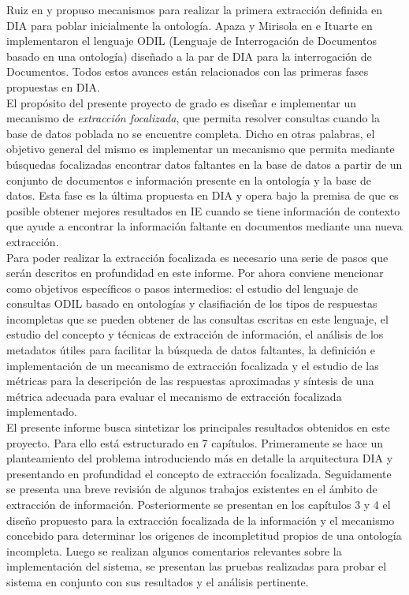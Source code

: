 Ruiz en \cite{ruiz-HMM} y \cite{SemistructuredTextExtraction} propuso mecanismos para realizar la primera extracción definida en DIA para poblar inicialmente la ontología. Apaza y Mirisola en \cite{ODILImplementation} e Ituarte en \cite{ODILImplementationDefinition} implementaron el lenguaje ODIL (Lenguaje de Interrogación de Documentos basado en una ontología) diseñado a la par de DIA para la interrogación de Documentos. Todos estos avances están relacionados con las primeras fases propuestas en DIA.  \\

El propósito del presente proyecto de grado es diseñar e implementar un mecanismo de \emph{extracción focalizada}, que permita resolver consultas cuando la base de datos poblada no se encuentre completa. Dicho en otras palabras, el objetivo general del mismo es implementar un mecanismo que permita mediante búsquedas focalizadas encontrar datos faltantes en la base de datos a partir de un conjunto de documentos e información presente en la ontología y la base de datos. Esta fase es la última propuesta en DIA y opera bajo la premisa de que es posible obtener mejores resultados en IE cuando se tiene información de contexto que ayude a encontrar la información faltante en documentos mediante una nueva extracción. \\

Para poder realizar la extracción focalizada es necesario una serie de pasos que serán descritos en profundidad en este informe. Por ahora conviene mencionar como objetivos específicos o pasos intermedios: el estudio del lenguaje de consultas ODIL basado en ontologías y clasifiación de los tipos de respuestas incompletas que se pueden obtener de las consultas escritas en este lenguaje, el estudio del concepto y técnicas de extracción de información, el análisis de los metadatos útiles para facilitar la búsqueda de datos faltantes, la definición e implementación de un mecanismo de extracción focalizada y el estudio de las métricas para la descripción de las respuestas aproximadas y síntesis de una métrica adecuada para evaluar el mecanismo de extracción focalizada implementado. \\

El presente informe busca sintetizar los principales resultados obtenidos en este proyecto. Para ello está estructurado en 7 capítulos. Primeramente se hace un planteamiento del problema introduciendo más en detalle la arquitectura DIA y presentando en profundidad el concepto de extracción focalizada. Seguidamente se presenta una breve revisión de algunos trabajos existentes en el ámbito de extracción de información. Posteriormente se presentan en los capítulos 3 y 4 el diseño propuesto para la extracción focalizada de la información y el mecanismo concebido para determinar los origenes de incompletitud propios de una ontología incompleta. Luego se realizan algunos comentarios relevantes sobre la implementación del sistema, se presentan las pruebas realizadas para probar el sistema en conjunto con sus resultados y el análisis pertinente. \\
